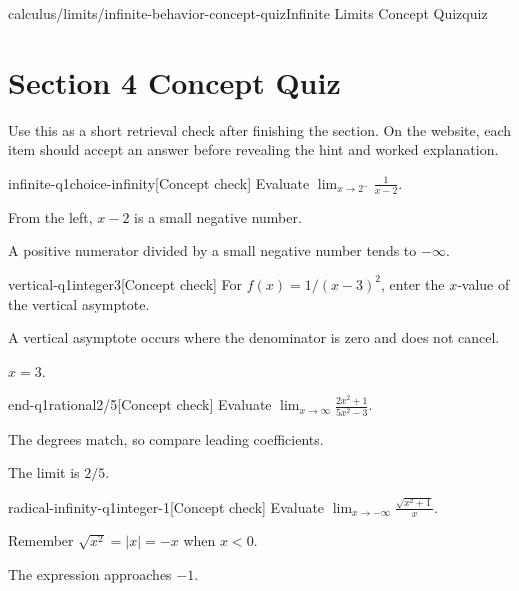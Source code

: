 \begin{webpage}{calculus/limits/infinite-behavior-concept-quiz}{Infinite Limits Concept Quiz}{quiz}
\section*{Section 4 Concept Quiz}

Use this as a short retrieval check after finishing the section. On the website, each item should accept an answer before revealing the hint and worked explanation.

\begin{bgcheck}{infinite-q1}{choice}{-infinity}[Concept check]
Evaluate \(\lim_{x\to2^-}\frac1{x-2}\).
\begin{bghint}
From the left, \(x-2\) is a small negative number.
\end{bghint}
\begin{bgreveal}
A positive numerator divided by a small negative number tends to \(-\infty\).
\end{bgreveal}
\end{bgcheck}

\begin{bgcheck}{vertical-q1}{integer}{3}[Concept check]
For \(f(x)=1/(x-3)^2\), enter the \(x\)-value of the vertical asymptote.
\begin{bghint}
A vertical asymptote occurs where the denominator is zero and does not cancel.
\end{bghint}
\begin{bgreveal}
\(x=3\).
\end{bgreveal}
\end{bgcheck}

\begin{bgcheck}{end-q1}{rational}{2/5}[Concept check]
Evaluate \(\lim_{x\to\infty}\frac{2x^2+1}{5x^2-3}\).
\begin{bghint}
The degrees match, so compare leading coefficients.
\end{bghint}
\begin{bgreveal}
The limit is \(2/5\).
\end{bgreveal}
\end{bgcheck}

\begin{bgcheck}{radical-infinity-q1}{integer}{-1}[Concept check]
Evaluate \(\lim_{x\to-\infty}\frac{\sqrt{x^2+1}}x\).
\begin{bghint}
Remember \(\sqrt{x^2}=|x|=-x\) when \(x<0\).
\end{bghint}
\begin{bgreveal}
The expression approaches \(-1\).
\end{bgreveal}
\end{bgcheck}


\end{webpage}
